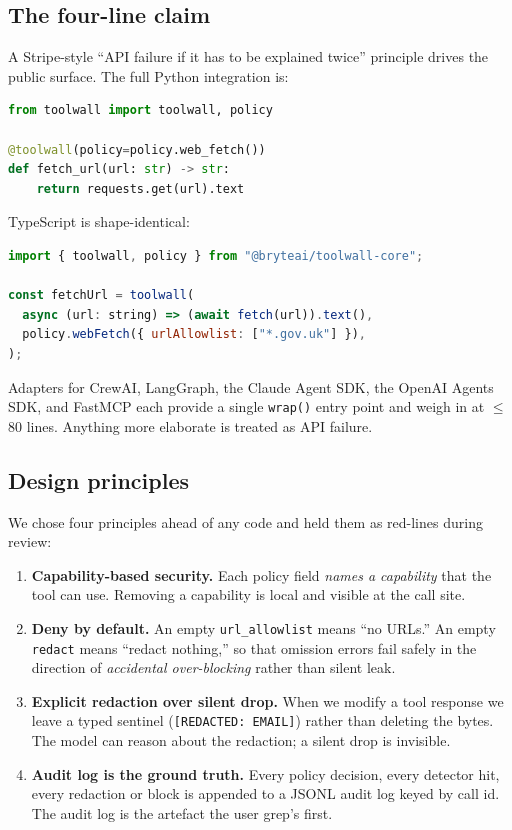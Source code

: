 \subsection{The four-line claim}

A Stripe-style ``API failure if it has to be explained twice''
principle drives the public surface. The full Python integration
is:

\begin{lstlisting}[language=Python]
from toolwall import toolwall, policy

@toolwall(policy=policy.web_fetch())
def fetch_url(url: str) -> str:
    return requests.get(url).text
\end{lstlisting}

\noindent
TypeScript is shape-identical:

\begin{lstlisting}[language=JavaScript]
import { toolwall, policy } from "@bryteai/toolwall-core";

const fetchUrl = toolwall(
  async (url: string) => (await fetch(url)).text(),
  policy.webFetch({ urlAllowlist: ["*.gov.uk"] }),
);
\end{lstlisting}

\noindent
Adapters for CrewAI, LangGraph, the Claude Agent SDK, the OpenAI
Agents SDK, and FastMCP each provide a single \verb|wrap()| entry
point and weigh in at $\le$80 lines. Anything more elaborate is
treated as API failure.

\subsection{Design principles}

We chose four principles ahead of any code and held them as
red-lines during review:

\begin{enumerate}[leftmargin=*,nosep]
\item \textbf{Capability-based security.} Each policy field
\emph{names a capability} that the tool can use. Removing a
capability is local and visible at the call site.
\item \textbf{Deny by default.} An empty \verb|url_allowlist| means
``no URLs.'' An empty \verb|redact| means ``redact nothing,'' so
that omission errors fail safely in the direction of
\emph{accidental over-blocking} rather than silent leak.
\item \textbf{Explicit redaction over silent drop.} When we
modify a tool response we leave a typed sentinel
(\verb|[REDACTED: EMAIL]|) rather than deleting the bytes. The
model can reason about the redaction; a silent drop is invisible.
\item \textbf{Audit log is the ground truth.} Every policy
decision, every detector hit, every redaction or block is
appended to a JSONL audit log keyed by call id. The audit log is
the artefact the user grep's first.
\end{enumerate}

